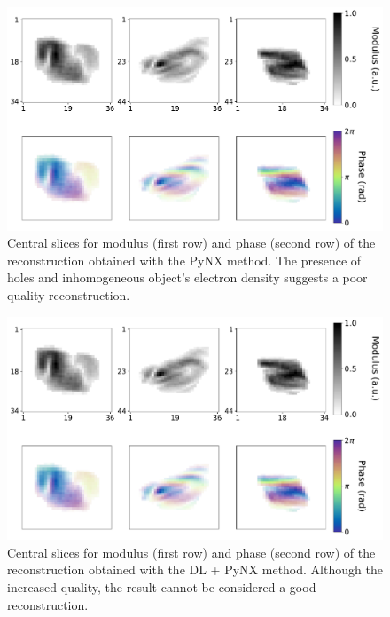 \begin{figure}[H]
  \centering
  \includegraphics[width=\textwidth]{figures/AD/dl_pynx_michael.pdf}
  \caption{Central slices for modulus (first row) and phase (second row) of the reconstruction obtained with the PyNX method.
           The presence of holes and inhomogeneous object's electron density suggests a poor quality reconstruction.}
  \label{fig:pynx_michael}
\end{figure}

\begin{figure}[H]
  \centering
  \includegraphics[width=\textwidth]{figures/AD/dl_pynx_michael.pdf}
  \caption{Central slices for modulus (first row) and phase (second row) of the reconstruction obtained with the DL + PyNX 
  method. Although the increased quality, the result cannot be considered a good reconstruction.}
  \label{fig:dl_pynx_michael}
\end{figure}

